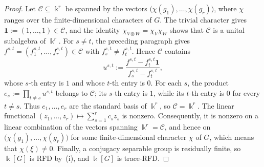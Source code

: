 \begin{proof}
    Let \(\mathcal{C}\subseteq\Bbbk^r\) be spanned by the vectors \(\bigl(\chi(g_1),\ldots,\chi(g_r)\bigr)\), where \(\chi\) ranges over the finite-dimensional characters of \(G\). The trivial character gives \(\mathbf{1}:=(1,\ldots,1)\in\mathcal{C}\), and the identity \(\chi_{V\otimes W}=\chi_V\chi_W\) shows that \(\mathcal{C}\) is a unital subalgebra of \(\Bbbk^r\). For \(s\neq t\), the preceding paragraph gives \(f^{s,t}=(f_1^{s,t},\ldots,f_r^{s,t})\in\mathcal{C}\) with \(f_s^{s,t}\neq f_t^{s,t}\). Hence \(\mathcal{C}\) contains
    \[
        u^{s,t}:=
        \frac{f^{s,t}-f_t^{s,t}\mathbf{1}}
        {f_s^{s,t}-f_t^{s,t}},
    \]
    whose \(s\)-th entry is \(1\) and whose \(t\)-th entry is \(0\). For each \(s\), the product \(e_s:=\prod_{t\neq s}u^{s,t}\) belongs to \(\mathcal{C}\); its \(s\)-th entry is \(1\), while its \(t\)-th entry is \(0\) for every \(t\neq s\). Thus \(e_1,\ldots,e_r\) are the standard basis of \(\Bbbk^r\), so \(\mathcal{C}=\Bbbk^r\). The linear functional \((z_1,\ldots,z_r)\mapsto\sum_{s=1}^{r}c_s z_s\) is nonzero. Consequently, it is nonzero on a linear combination of the vectors spanning \(\Bbbk^r=\mathcal{C}\), and hence on \(\bigl(\chi(g_1),\ldots,\chi(g_r)\bigr)\) for some finite-dimensional character \(\chi\) of \(G\), which means that \(\chi(\xi)\neq 0\). Finally, a conjugacy separable group is residually finite, so \(\Bbbk[G]\) is RFD by~(i), and \(\Bbbk[G]\) is trace-RFD.
\end{proof}
